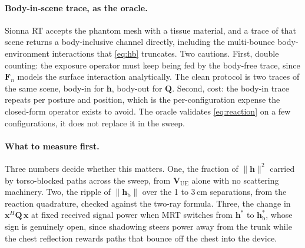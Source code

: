 \documentclass[11pt]{article}
\newcommand{\xx}{\mathbf{x}}
\newcommand{\hh}{\mathbf{h}}
\newcommand{\Qmat}{\mathbf{Q}}
\newcommand{\Fn}{\mathbf{F}_n}
\newcommand{\hb}{\hh_{\mathrm{b}}}
\theoremstyle{remark}
\begin{document}
\paragraph{Body-in-scene trace, as the oracle.}
Sionna RT accepts the phantom mesh with a tissue material, and a
trace of that scene returns a body-inclusive channel directly,
including the multi-bounce body-environment interactions that
\cref{eq:hb} truncates. Two cautions. First, double counting: the
exposure operator must keep being fed by the body-free trace, since
$\Fn$ models the surface interaction analytically. The clean
protocol is two traces of the same scene, body-in for $\hh$, body-out
for $\Qmat$. Second, cost: the body-in trace repeats per posture and
position, which is the per-configuration expense the closed-form
operator exists to avoid. The oracle validates \cref{eq:reaction} on
a few configurations, it does not replace it in the sweep.

\paragraph{What to measure first.}
Three numbers decide whether this matters. One, the fraction of
$\|\hh\|^2$ carried by torso-blocked paths across the sweep, from
$\mathbf{V}_{\mathrm{UE}}$ alone with no scattering machinery. Two,
the ripple of $\|\hb\|$ over the 1 to 3\,cm separations, from the
reaction quadrature, checked against the two-ray formula. Three, the
change in $\xx^H \Qmat\, \xx$ at fixed received signal power when MRT
switches from $\hh^{*}$ to $\hb^{*}$, whose sign is genuinely open,
since shadowing steers power away from the trunk while the chest
reflection rewards paths that bounce off the chest into the device.
\end{document}
